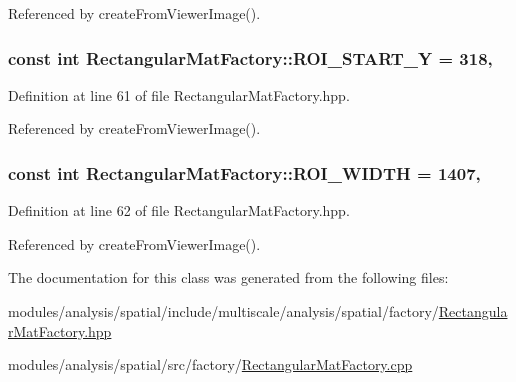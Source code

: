 Referenced by create\-From\-Viewer\-Image().

\hypertarget{classmultiscale_1_1analysis_1_1RectangularMatFactory_a1a25934dba59fe883d88e9735eb33db6}{
\subsubsection[{R\-O\-I\-\_\-\-S\-T\-A\-R\-T\-\_\-\-Y}]{\setlength{\rightskip}{0pt plus 5cm}const int Rectangular\-Mat\-Factory\-::\-R\-O\-I\-\_\-\-S\-T\-A\-R\-T\-\_\-\-Y = 318\hspace{0.3cm}{\ttfamily [static]}, {\ttfamily [private]}}}\label{classmultiscale_1_1analysis_1_1RectangularMatFactory_a1a25934dba59fe883d88e9735eb33db6}


Definition at line 61 of file Rectangular\-Mat\-Factory.\-hpp.



Referenced by create\-From\-Viewer\-Image().

\hypertarget{classmultiscale_1_1analysis_1_1RectangularMatFactory_aeb6f19ae65802df5f876cd0e15b27a48}{
\subsubsection[{R\-O\-I\-\_\-\-W\-I\-D\-T\-H}]{\setlength{\rightskip}{0pt plus 5cm}const int Rectangular\-Mat\-Factory\-::\-R\-O\-I\-\_\-\-W\-I\-D\-T\-H = 1407\hspace{0.3cm}{\ttfamily [static]}, {\ttfamily [private]}}}\label{classmultiscale_1_1analysis_1_1RectangularMatFactory_aeb6f19ae65802df5f876cd0e15b27a48}


Definition at line 62 of file Rectangular\-Mat\-Factory.\-hpp.



Referenced by create\-From\-Viewer\-Image().



The documentation for this class was generated from the following files\-:\begin{DoxyCompactItemize}
\item 
modules/analysis/spatial/include/multiscale/analysis/spatial/factory/\hyperlink{RectangularMatFactory_8hpp}{Rectangular\-Mat\-Factory.\-hpp}\item 
modules/analysis/spatial/src/factory/\hyperlink{RectangularMatFactory_8cpp}{Rectangular\-Mat\-Factory.\-cpp}\end{DoxyCompactItemize}
